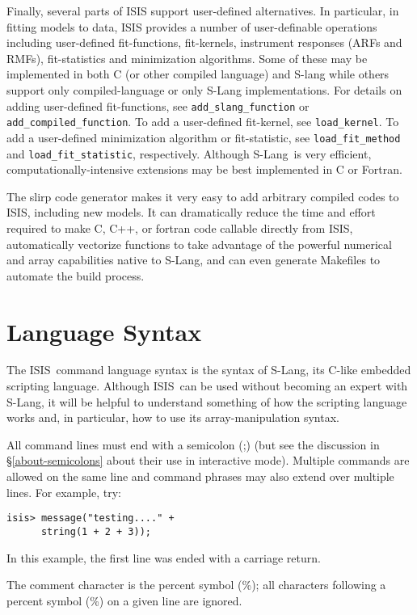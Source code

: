 \documentclass{book}
\newcommand{\isisx}{{\sc ISIS~}}
\newcommand{\isis}{{\sc ISIS}}
\newcommand{\slang}{{\sc S-Lang}}
\begin{document}
{Finally, several parts of ISIS support user-defined
alternatives. In particular, in fitting models to data, ISIS
provides a number of user-definable operations including
user-defined fit-functions, fit-kernels, instrument responses
(ARFs and RMFs), fit-statistics and minimization algorithms.
Some of these may be implemented in both C (or other compiled
language) and S-lang while others support only
compiled-language or only S-Lang implementations. For details
on adding user-defined fit-functions, see
\verb|add_slang_function| or \verb|add_compiled_function|. To
add a user-defined fit-kernel, see \verb|load_kernel|. To add a
user-defined minimization algorithm or fit-statistic, see
\verb|load_fit_method| and \verb|load_fit_statistic|,
respectively. Although \slang\ is very efficient,
computationally-intensive extensions may be best implemented in
C or Fortran.

The {\sc slirp} code generator makes it very easy to add
arbitrary compiled codes to \isis, including new models.  It
can dramatically reduce the time and effort required to make C,
C++, or {\sc fortran} code callable directly from \isis,
automatically vectorize functions to take advantage of the
powerful numerical and array capabilities native to \slang, and
can even generate Makefiles to automate the build process.

\section{Language Syntax}

The \isisx command language syntax is the syntax of \slang, its
C-like embedded scripting language. Although \isisx can be used
without becoming an expert with \slang, it will be helpful to
understand something of how the scripting language works and, in
particular, how to use its array-manipulation syntax.

All command lines must end with a semicolon (;) (but see the
discussion in \S\ref{about-semicolons} about their use in
interactive mode). Multiple commands are allowed on the same line
and command phrases may also extend over multiple lines.  For
example, try:
\begin{verbatim}
isis> message("testing...." +
      string(1 + 2 + 3));
\end{verbatim}
In this example, the first line was ended with a carriage return.

The comment character is the percent symbol (\%);  all characters
following a percent symbol (\%) on a given line are ignored.

}
\end{document}
